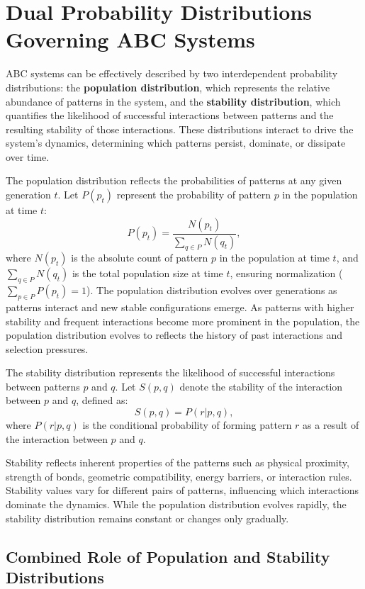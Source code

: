 \documentclass[entropy,article,submit,pdftex,moreauthors]{Definitions/mdpi}
\begin{document}
\section{Dual Probability Distributions Governing ABC Systems}

ABC systems can be effectively described by two interdependent probability distributions: the \textbf{population distribution}, which represents the relative abundance of patterns in the system, and the \textbf{stability distribution}, which quantifies the likelihood of successful interactions between patterns and the resulting stability of those interactions. These distributions interact to drive the system's dynamics, determining which patterns persist, dominate, or dissipate over time.

The population distribution reflects the probabilities of patterns at any given generation \( t \). Let \( P(p_t) \) represent the probability of pattern \( p \) in the population at time \( t \):
\[
P(p_t) = \frac{N(p_t)}{\sum_{q \in P} N(q_t)},
\]
where \( N(p_t) \) is the absolute count of pattern \( p \) in the population at time \( t \), and \( \sum_{q \in P} N(q_t) \) is the total population size at time \( t \), ensuring normalization (\( \sum_{p \in P} P(p_t) = 1 \)). The population distribution evolves over generations as patterns interact and new stable configurations emerge. As patterns with higher stability and frequent interactions become more prominent in the population, the population distribution evolves to reflects the history of past interactions and selection pressures.

The stability distribution represents the likelihood of successful interactions between patterns \( p \) and \( q \). Let \( S(p, q) \) denote the stability of the interaction between \( p \) and \( q \), defined as:
\[
S(p, q) = P(r | p, q),
\]
where \( P(r | p, q) \) is the conditional probability of forming pattern \( r \) as a result of the interaction between \( p \) and \( q \).

Stability reflects inherent properties of the patterns such as physical proximity, strength of bonds, geometric compatibility, energy barriers, or interaction rules. Stability values vary for different pairs of patterns, influencing which interactions dominate the dynamics. While the population distribution evolves rapidly, the stability distribution remains constant or changes only gradually.

\subsection{Combined Role of Population and Stability Distributions}
\end{document}
